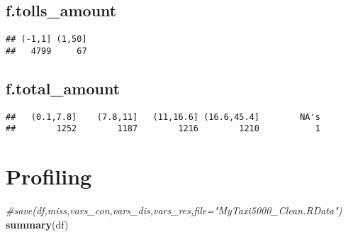 \documentclass[]{article}
\newenvironment{Shaded}{\begin{snugshade}}{\end{snugshade}}
\newcommand{\KeywordTok}[1]{\textcolor[rgb]{0.13,0.29,0.53}{\textbf{{#1}}}}
\newcommand{\DataTypeTok}[1]{\textcolor[rgb]{0.13,0.29,0.53}{{#1}}}
\newcommand{\DecValTok}[1]{\textcolor[rgb]{0.00,0.00,0.81}{{#1}}}
\newcommand{\CommentTok}[1]{\textcolor[rgb]{0.56,0.35,0.01}{\textit{{#1}}}}
\newcommand{\NormalTok}[1]{{#1}}
\begin{document}
\subsection{f.tolls\_amount}\label{f.tolls_amount}

\begin{Shaded}
\end{Shaded}

\begin{verbatim}
## (-1,1] (1,50] 
##   4799     67
\end{verbatim}

\subsection{f.total\_amount}\label{f.total_amount}

\begin{Shaded}
\end{Shaded}

\begin{verbatim}
##   (0.1,7.8]    (7.8,11]   (11,16.6] (16.6,45.4]        NA's 
##        1252        1187        1216        1210           1
\end{verbatim}

\section{Profiling}\label{profiling}

\begin{Shaded}
\begin{Highlighting}[]
\CommentTok{#save(df,miss,vars_con,vars_dis,vars_res,file="MyTaxi5000_Clean.RData")}
\KeywordTok{summary}\NormalTok{(df)}
\end{Highlighting}
\end{Shaded}
\end{document}

